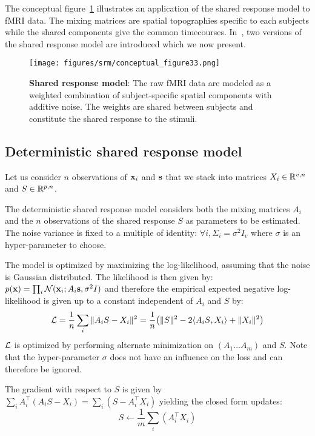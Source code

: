 \documentclass{article}
\begin{document}
The conceptual figure~\ref{fig:srm:conceptual_figure} illustrates an 
application of the shared response model to fMRI data.
%
The mixing
matrices are spatial topographies specific to each subjects while the shared
components give the common timecourses.
%
In~\cite{chen2015reduced, anderson2016enabling}, two versions of the shared
response model are introduced which we now present.
% 


\begin{figure}
  \centering
  \texttt{[image: figures/srm/conceptual\_figure33.png]}
  \caption{\textbf{Shared response model}: The raw fMRI data are modeled as a
    weighted combination of subject-specific spatial components with additive
    noise.
    The weights are shared between subjects and constitute the shared response
    to the stimuli.
  }
  \label{fig:srm:conceptual_figure}
\end{figure}


\subsection{Deterministic shared response model}
\label{sec:deterministicsrm}
Let us consider $n$ observations of $\mathbf{x}_i$ and $\mathbf{s}$ that we stack into
matrices $X_i \in \mathbb{R}^{v, n}$ and $S \in \mathbb{R}^{p, n}$.


The deterministic shared response model considers both the mixing matrices $A_i$ and
the $n$ observations of the shared response $S$ as parameters to be
estimated.
%
The noise variance is fixed to a multiple of identity: $\forall i,
\Sigma_i=\sigma^2 I_v$ where $\sigma$ is an hyper-parameter to choose.


The model is optimized by maximizing the log-likelihood, assuming that
the noise is Gaussian distributed.
%
The likelihood is then given by: $p(\mathbf{x}) = \prod_i \mathcal{N}(\mathbf{x}_i; A_i \mathbf{s}, \sigma^2 I)$ and
therefore the empirical expected negative log-likelihood is given up to a constant independent of
$A_i$ and $S$ by:
\begin{align}
  \mathcal{L} = \frac1{n} \sum_i \|A_i S - X_i \|^2 = \frac1{n} \big(\| S \|^2 -2 \langle{ A_i S},{ X_i }\rangle + \| X_i \|^2 \big)
  \label{eq:detsrmloss}
\end{align}
$\mathcal{L}$ is optimized by performing alternate minimization on $(A_1 \dots A_m)$
and $S$.
%
Note that the hyper-parameter $\sigma$ does not have an influence on
the loss and can therefore be ignored.



The gradient with respect to $S$ is given by $\sum_i A_i^{\top}(A_i S -
X_i) = \sum_i (S -
A_i^{\top} X_i)$
yielding the closed form updates:
\begin{equation}
  S \leftarrow  \frac1m \sum_i (A_i^{\top} X_i)
  \label{eq:srm:supdate}
\end{equation}
\end{document}
